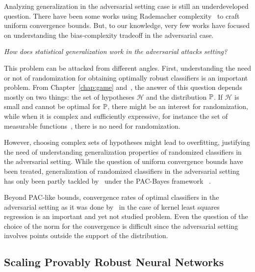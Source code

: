 Analyzing generalization in the adversarial setting case is still an underdeveloped question. There have been some works using Rademacher complexity~\citep{yin2019rademacher,awasthi2020adversarial} to craft uniform convergence bounds. But, to our knowledge, very few works have focused on  understanding the bias-complexity tradeoff in the adversarial case.

\begin{tcolorbox}[colback=grund,colframe=rahmen]
    \begin{center}
    \emph{How does statistical generalization work in the adversarial attacks setting?}
    \end{center}
\end{tcolorbox}

This problem can be attacked from different angles. First, understanding the need or not of randomization for obtaining optimally robust classifiers is an important problem. From Chapter~\ref{chap:game} and~\citet{pydi2021many}, the answer of this question depends mostly on two things: the set of hypotheses $\mathcal{H}$ and the distribution $\mathbb{P}$. If $\mathcal{H}$ is small and cannot be optimal for $\mathbb{P}$, there might be an interest for randomization, while when it is  complex and sufficiently expressive, for instance the set of measurable functions~\citep{pydi2021many}, there is no need for randomization. 

However, choosing complex sets of hypotheses might lead to overfitting, justifying the need of understanding generalization properties of randomized classifiers in the adversarial setting. While the question of uniform convergence bounds have been treated, generalization of randomized classifiers in the adversarial setting has only been partly tackled by~\citet{viallard2021pac} under the PAC-Bayes framework~\citep{guedj2019primer} . 

Beyond PAC-like bounds,  convergence rates of optimal classifiers in the adversarial setting as it was done by~\citet{fischer2020sobolev} in the case of kernel least squares regression is an important and yet not studied problem. Even the question of the choice of the norm for the convergence is difficult since the adversarial setting involves points outside the support of the distribution. 



\subsection{Scaling Provably Robust Neural Networks}

